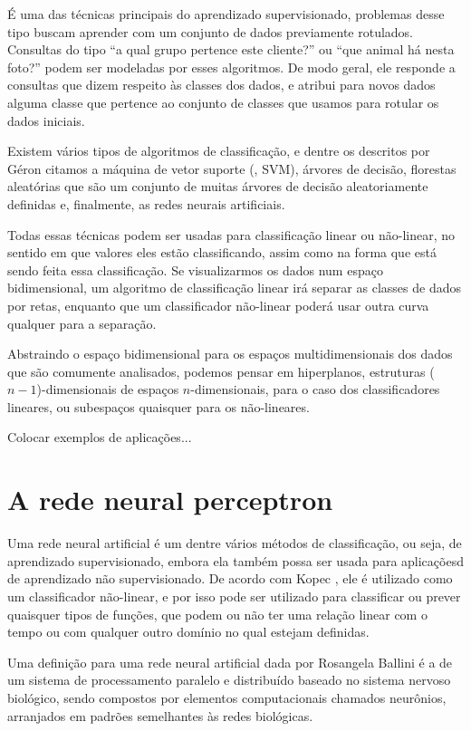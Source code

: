 É uma das técnicas principais do aprendizado supervisionado, problemas desse tipo buscam aprender com um conjunto de dados previamente rotulados. Consultas do tipo ``a qual grupo pertence este cliente?'' ou ``que animal há nesta foto?'' podem ser modeladas por esses algoritmos. De modo geral, ele responde a consultas que dizem respeito às classes dos dados, e atribui para novos dados alguma classe que pertence ao conjunto de classes que usamos para rotular os dados iniciais.

Existem vários tipos de algoritmos de classificação, e dentre os descritos por Géron \citep{hands} citamos a máquina de vetor suporte (, SVM), árvores de decisão, florestas aleatórias que são um conjunto de muitas  árvores de decisão aleatoriamente definidas e, finalmente, as redes neurais artificiais.

Todas essas técnicas podem ser usadas para classificação linear ou não-linear, no sentido em que valores eles estão classificando, assim como na forma que está sendo feita essa classificação. Se visualizarmos os dados num espaço bidimensional, um algoritmo de classificação linear irá separar as classes de dados por retas, enquanto que um classificador não-linear poderá usar outra curva qualquer para a separação. 

Abstraindo o espaço bidimensional para os espaços multidimensionais dos dados que são comumente analisados, podemos pensar em hiperplanos, estruturas ($n{-}1$)-dimensionais de espaços $n$-dimensionais, para o caso dos classificadores lineares, ou subespaços quaisquer para os não-lineares.

Colocar exemplos de aplicações...

\section{A rede neural perceptron}

Uma rede neural artificial é um dentre vários métodos de classificação, ou seja, de aprendizado supervisionado, embora ela também possa ser usada para aplicaçõesd de aprendizado não supervisionado. De acordo com Kopec \citep{classic}, ele é utilizado como um classificador não-linear, e por isso pode ser utilizado para classificar ou prever quaisquer tipos de funções, que podem ou não ter uma relação linear com o tempo ou com qualquer outro domínio no qual estejam definidas.

Uma definição para uma rede neural artificial dada por Rosangela Ballini \citep{doutorado} é a de um sistema de processamento paralelo e distribuído baseado no sistema nervoso biológico, sendo compostos por elementos computacionais chamados neurônios, arranjados em padrões semelhantes às redes biológicas.

